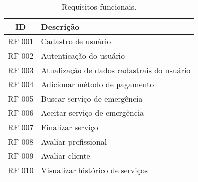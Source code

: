 \documentclass{article}
\begin{document}
\begin{table}[h!]
  \begin{center}
    \caption{Requisitos funcionais.}
    \label{tab:table2}
    \begin{tabular}{|c|l|} 
      \hline
      \textbf{ID} & \textbf{Descrição}\\
      \hline
      RF 001 & Cadastro de usuário \\
      \hline
      RF 002 & Autenticação do usuário \\
      \hline
      RF 003 & Atualização de dados cadastrais do usuário \\
      \hline
      RF 004 & Adicionar método de pagamento \\
      \hline
      RF 005 & Buscar serviço de emergência \\
      \hline
      RF 006 & Aceitar serviço de emergência \\
      \hline
      RF 007 & Finalizar serviço \\
      \hline
      RF 008 & Avaliar profissional \\
      \hline
      RF 009 & Avaliar cliente \\
      \hline
      RF 010 & Visualizar histórico de serviços \\
      \hline
    \end{tabular}
  \end{center}
\end{table}
\end{document}
